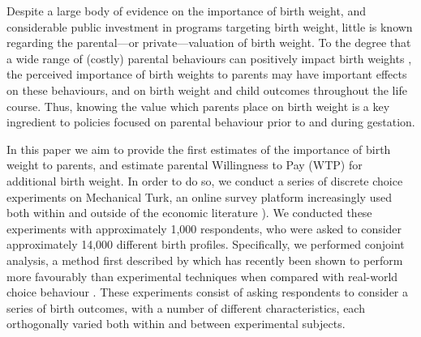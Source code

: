 \documentclass[a4paper, 11pt]{article}
\begin{document}
\begin{spacing}{1.4}
Despite a large body of evidence on the importance of birth weight, and
considerable public investment in programs targeting birth weight, little is
known regarding the parental---or private---valuation of birth weight.
To the degree that a wide range of (costly) parental behaviours can
positively impact birth weights \citep{RosenzweigSchulz1983,
  ChevalierOSullivan2007,SextonHebel1984}, the perceived importance of
birth weights to parents may have important effects on these behaviours,
and on birth weight and child outcomes throughout the life course. Thus,
knowing the value which parents place on birth weight is a key ingredient
to policies focused on parental behaviour prior to and during gestation.

In this paper we aim to provide the first estimates of the importance of
birth weight to parents, and estimate parental Willingness to Pay (WTP)
for additional birth weight.
In order to do so, we conduct a series of discrete choice experiments
on Mechanical Turk, an online survey platform increasingly used both
within and outside of the economic literature \citep{Kuziemkoetal2015,
  Jordanetal2016}).  We conducted these experiments with approximately
1,000 respondents, who were asked to consider approximately 14,000
different birth profiles.  Specifically, we performed conjoint analysis,
a method first described by \citet{Lancaster1966} which has recently
been shown to perform more favourably than experimental techniques when
compared with real-world choice behaviour \citep{Hainmuelleretal2015}.
These experiments consist of
asking respondents to consider a series of birth outcomes, with a number
of different characteristics, each orthogonally varied both within and
between experimental subjects.


\end{spacing}
\end{document}
